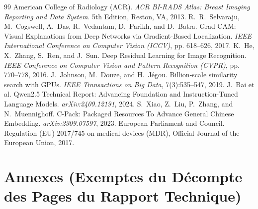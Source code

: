 \documentclass[11pt,a4paper]{article}
\begin{document}
\begin{thebibliography}{99}
 American College of Radiology (ACR). \textit{ACR BI-RADS Atlas: Breast Imaging Reporting and Data System}. 5th Edition, Reston, VA, 2013.
 R.~R.~Selvaraju, M.~Cogswell, A.~Das, R.~Vedantam, D.~Parikh, and D.~Batra. Grad-CAM: Visual Explanations from Deep Networks via Gradient-Based Localization. \textit{IEEE International Conference on Computer Vision (ICCV)}, pp. 618--626, 2017.
 K.~He, X.~Zhang, S.~Ren, and J.~Sun. Deep Residual Learning for Image Recognition. \textit{IEEE Conference on Computer Vision and Pattern Recognition (CVPR)}, pp. 770--778, 2016.
 J.~Johnson, M.~Douze, and H.~Jégou. Billion-scale similarity search with GPUs. \textit{IEEE Transactions on Big Data}, 7(3):535--547, 2019.
 J.~Bai et al. Qwen2.5 Technical Report: Advancing Foundation and Instruction-Tuned Language Models. \textit{arXiv:2409.12191}, 2024.
 S.~Xiao, Z.~Liu, P.~Zhang, and N.~Muennighoff. C-Pack: Packaged Resources To Advance General Chinese Embedding. \textit{arXiv:2309.07597}, 2023.
 European Parliament and Council. Regulation (EU) 2017/745 on medical devices (MDR), Official Journal of the European Union, 2017.
\end{thebibliography}

\newpage

\appendix
\section*{Annexes (Exemptes du Décompte des Pages du Rapport Technique)}
\end{document}
